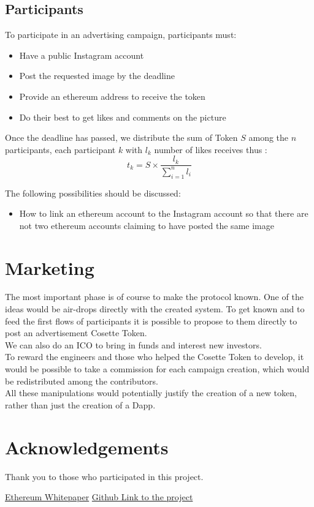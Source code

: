 \documentclass[10pt]{article}
\begin{document}
\subsection{Participants}
To participate in an advertising campaign, participants must:
\begin{itemize}
  \item Have a public Instagram account
  \item Post the requested image by the deadline
  \item Provide an ethereum address to receive the token
  \item Do their best to get likes and comments on the picture
\end{itemize}
Once the deadline has passed, we distribute the sum of Token $S$ among the $n$ participants, each participant $k$ with $l_k$ number of likes receives thus :
\begin{equation}
t_k = S \times \frac{l_k}{\sum_{i=1}^{n}{l_i}}
\end{equation}

The following possibilities should be discussed:
\begin{itemize}
  \item How to link an ethereum account to the Instagram account so that there are not two ethereum accounts claiming to have posted the same image
\end{itemize}

\section{Marketing}
The most important phase is of course to make the protocol known. One of the ideas would be air-drops directly with the created system. To get known and to feed the first flows of participants it is possible to propose to them directly to post an advertisement Cosette Token. \\
We can also do an ICO to bring in funds and interest new investors.   \\ 
To reward the engineers and those who helped the Cosette Token to develop, it would be possible to take a commission for each campaign creation, which would be redistributed among the contributors.  \\
All these manipulations would potentially justify the creation of a new token, rather than just the creation of a Dapp.

\section*{Acknowledgements}
Thank you to those who participated in this project.

\begin{thebibliography}{99}

\bibitem{} \href{https://ethereum.org/en/whitepaper/}{Ethereum Whitepaper}
\bibitem{} \href{https://github.com/tttienthinh/Cosette}{Github Link to the project}


\end{thebibliography}

\end{document}
